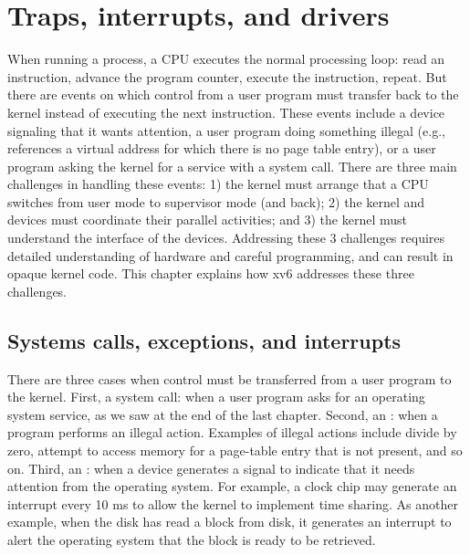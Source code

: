 \chapter{Traps, interrupts, and drivers}
\label{CH:TRAP}

When running a process, a CPU executes the normal processing loop: read an
instruction, advance the program counter, execute the instruction, repeat.  But
there are events on which control from a user program must transfer back to the
kernel instead of executing the next instruction.  These events include a device
signaling that it wants attention, a user program doing something illegal (e.g.,
references a virtual address for which there is no page table entry), or a user
program asking the kernel for a service with a system call.  There are three
main challenges in handling these events: 1) the kernel must arrange that a
CPU switches from user mode to supervisor mode (and back); 2) the kernel and
devices must coordinate their parallel activities; and 3) the kernel must
understand the interface of the devices.  Addressing these 3 challenges requires
detailed understanding of hardware and careful programming, and can result in
opaque kernel code.  This chapter explains how xv6 addresses these three
challenges.

\section{Systems calls, exceptions, and interrupts}

There are three cases when control must be transferred from a user program to
the kernel. First, a system call: when a user program asks for an operating
system service, as we saw at the end of the last chapter.
Second, an
:
when a program performs an illegal action. Examples of illegal actions include
divide by zero, attempt to access memory for a page-table entry that is not
present, and so on.  Third, an
:
when a device generates a signal to indicate that
it needs attention from the operating system.  For example, a clock chip may
generate an interrupt every 10 ms to allow the kernel to implement
time sharing.  As another example, when the disk has read a block from
disk, it generates an interrupt to alert the operating system that the
block is ready to be retrieved.


